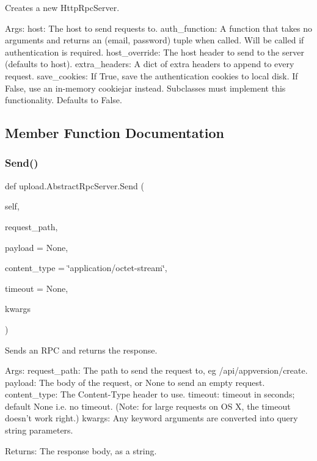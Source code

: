 \begin{DoxyVerb}Creates a new HttpRpcServer.

Args:
  host: The host to send requests to.
  auth_function: A function that takes no arguments and returns an
(email, password) tuple when called. Will be called if authentication
is required.
  host_override: The host header to send to the server (defaults to host).
  extra_headers: A dict of extra headers to append to every request.
  save_cookies: If True, save the authentication cookies to local disk.
If False, use an in-memory cookiejar instead.  Subclasses must
implement this functionality.  Defaults to False.
\end{DoxyVerb}
 

\subsection{Member Function Documentation}
\mbox{\label{classupload_1_1AbstractRpcServer_ac1b913f8bd00da4741c47ab49ea94cb5}} 
\subsubsection{\texorpdfstring{Send()}{Send()}\hspace{0.1cm}{\footnotesize\ttfamily [1/2]}}
{\footnotesize\ttfamily def upload.\+Abstract\+Rpc\+Server.\+Send (\begin{DoxyParamCaption}\item[{}]{self,  }\item[{}]{request\+\_\+path,  }\item[{}]{payload = {\ttfamily None},  }\item[{}]{content\+\_\+type = {\ttfamily \char`\"{}application/octet-\/stream\char`\"{}},  }\item[{}]{timeout = {\ttfamily None},  }\item[{}]{kwargs }\end{DoxyParamCaption})}

\begin{DoxyVerb}Sends an RPC and returns the response.

Args:
  request_path: The path to send the request to, eg /api/appversion/create.
  payload: The body of the request, or None to send an empty request.
  content_type: The Content-Type header to use.
  timeout: timeout in seconds; default None i.e. no timeout.
(Note: for large requests on OS X, the timeout doesn't work right.)
  kwargs: Any keyword arguments are converted into query string parameters.

Returns:
  The response body, as a string.
\end{DoxyVerb}
 \mbox{\label{classupload_1_1AbstractRpcServer_ac1b913f8bd00da4741c47ab49ea94cb5}} 

